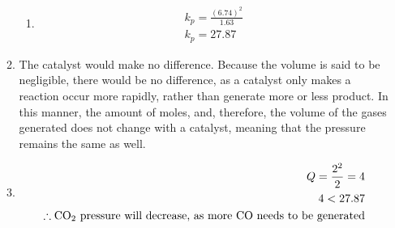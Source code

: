 \documentclass[12pt]{article}
\begin{document}
\begin{enumerate}
\begin{enumerate}
\begin{enumerate}
      \item

        \begin{equation}
          \begin{split}
            k_p=\frac{(6.74)^2}{1.63}\\
            k_p=27.87
          \end{split}
          \label{4}
        \end{equation}



        \end{enumerate}

      \item The catalyst would make no difference. Because the volume is said to be negligible, there would be no difference, as a catalyst only makes a reaction occur more rapidly, rather than generate more or less product. In this manner, the amount of moles, and, therefore, the volume of the gases generated does not change with a catalyst, meaning that the pressure remains the same as well.

      \item

        \begin{equation}
          \begin{split}
            Q=\frac{2^2}{2}=4\\
            4<27.87\\
            \therefore \ce{CO2}\text{ pressure will decrease, as more \ce{CO} needs to be generated}
          \end{split}
          \label{5}
        \end{equation}

    \end{enumerate}

\end{enumerate}
\end{document}
